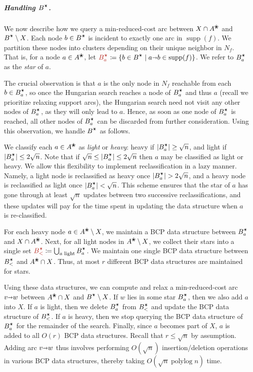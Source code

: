 \documentclass[a4paper,UKenglish]{socg-lipics-v2019}
\def\polylog{\mathop{\mathrm{polylog}}}
\def\abs#1{\mathopen| #1 \mathclose|}		%
\def\arcto{\mathord\shortrightarrow}
\def\arc#1#2{#1\arcto#2}
\def\supp{\operatorname{supp}}
\def\alive#1{{#1}^\text{\ding{96}}}
\def\star{\text{\ding{84}}}
\theoremstyle{plain}
\numberwithin{figure}{section}
\renewcommand{\paragraph}{\subparagraph}
\def\EMPH#1{\textcolor{BrickRed}{{\emph{#1}}}}
\begin{document}
\paragraph{Handling $B^\star$.}
We now describe how we query a min-reduced-cost arc between $X \cap \alive{A}$
and $B^\star \setminus X$.
Each node $b \in B^\star$ is incident to exactly one arc in
$\supp(f)$.
We partition these nodes into clusters depending on their unique neighbor in $N_f$.
That is, for a node $a \in \alive{A}$,
let $\EMPH{$B_a^\star$} \coloneqq \{b \in B^\star \mid {\arc ab} \in \supp(f)\}$.
We refer to $B_a^\star$ as the \EMPH{star} of $a$.

The crucial observation is that $a$ is the only node in $N_f$ reachable from
each $b \in B_a^\star$, so once the Hungarian search reaches a node of $B_a^\star$ and thus
$a$ (recall we prioritize relaxing support arcs), the Hungarian search need
not visit any other nodes of $B_a^\star$, as they will only lead to $a$.
Hence, as soon as one node of $B_a^\star$ is reached, all other nodes of $B_a^\star$ can be
discarded from further consideration.
Using this observation, we handle $B^\star$ as follows.

We classify each $a \in \alive{A}$ as \EMPH{light} or \EMPH{heavy}:
heavy if $\abs{B_a^\star} \geq \sqrt{n}$,
and light if $\abs{B_a^\star} \leq 2\sqrt{n}$.
Note that if $\sqrt{n} \leq \abs{B_a^\star} \leq 2\sqrt{n}$ then $a$ may be classified
as light or heavy.
We allow this flexibility to implement reclassification in a lazy manner.
Namely, a light node is reclassified as heavy once $\abs{B_a^\star} > 2\sqrt{n}$,
and a heavy node is reclassified as light once $\abs{B_a^\star} < \sqrt{n}$.
This scheme ensures that the star of $a$ has gone through at least $\sqrt{n}$
updates between two successive reclassifications,
and these updates will pay for the time spent in updating the data structure
when $a$ is re-classified.

For each heavy node $a \in \alive{A} \setminus X$, we maintain a BCP data
structure between $B_a^\star$ and $X \cap \alive{A}$.
Next, for all light nodes in $\alive{A} \setminus X$, we collect their stars into
a single set $\EMPH{$B_<^\star$} \coloneqq \bigcup_{\text{$a$ light}} B_a^\star$.
We maintain one single BCP data structure between $B_<^\star$ and $\alive{A} \cap X$.
Thus, at most $r$ different BCP data structures are maintained for stars.

Using these data structures, we can compute and relax a min-reduced-cost arc $\arc vw$ between
$\alive{A} \cap X$ and $B^\star \setminus X$.
If $w$ lies in some star $B_a^\star$, then we also add $a$ into $X$.
If $a$ is light, then we delete $B_a^\star$ from $B_<^\star$ and update the BCP data structure of $B_<^\star$.
If $a$ is heavy, then we stop querying the BCP data structure of $B_a^\star$ for the
remainder of the search.
Finally, since $a$ becomes part of $X$, $a$ is added to all $O(r)$ BCP data structures.
%
Recall that $r \leq \sqrt{n}$ by assumption.
Adding arc $\arc vw$ thus involves performing $O(\sqrt{n})$
insertion/deletion operations in various BCP data structures, thereby taking
$O(\sqrt{n}\polylog n)$ time.
\end{document}
